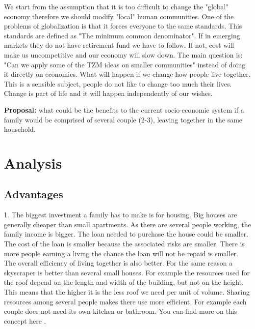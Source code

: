 \documentclass{article}
\begin{document}
We start from the assumption that it is too difficult to change the "global" economy therefore we should modify "local" human communities.
One of the problems of globalization is that it forces everyone to the same standards.
This standards are defined as "The minimum common denominator".
If in emerging markets they do not have retirement fund we have to follow.
If not, cost will make us uncompetitive and our economy will slow down.
The main question is: "Can we apply some of the TZM ideas on smaller communities" instead of doing it directly on economies.
What will happen if we change how people live together.
This is a sensible subject, people do not like to change too much their lives.
Change is part of life and it will happen independently of our wishes.

\textbf{Proposal:} what could be the benefits to the current socio-economic system if a family would be comprised of several couple (2-3), leaving together in the same household. 

\section{Analysis}
\subsection{Advantages}

1. The biggest investment a family has to make is for housing.
Big houses are generally cheaper than small apartments.
As there are several people working, the family income is bigger.
The loan needed to purchase the house could be smaller.
The cost of the loan is smaller because the associated risks are smaller.
There is more people earning a living the chance the loan will not be repaid is smaller.
The overall efficiency of living together is also better.
For the same reason a skyscraper is better than several small houses.
For example the resources used for the roof depend on the length and width of the building, but not on the height.
This means that the higher it is the less roof we need per unit of volume.
Sharing resources among several people makes there use more efficient. 
For example each couple does not need its own kitchen or bathroom.
You can find more on this concept here \cite{organism_growth}.
\end{document}
